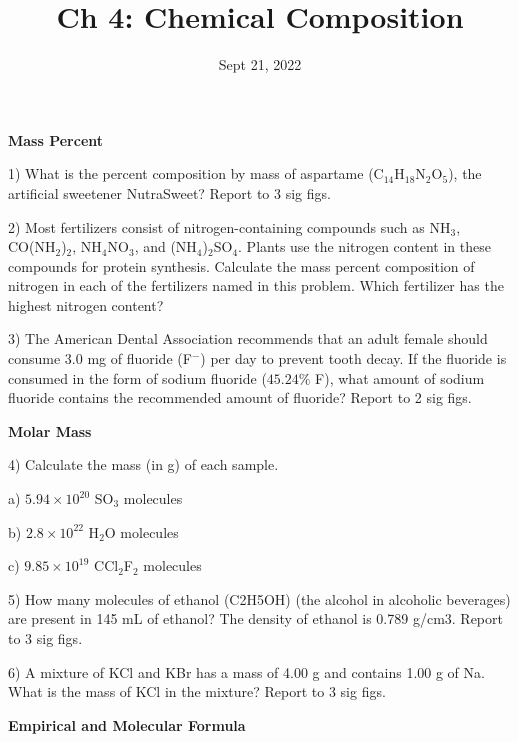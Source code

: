 \documentclass[12pt]{article}
\title{\textbf{Ch 4: Chemical Composition}}
\date{Sept 21, 2022}
\begin{document}
\maketitle 

\textbf{Mass Percent}

1) What is the percent composition by mass of aspartame (C$_{14}$H$_{18}$N$_2$O$_5$),
the artificial sweetener NutraSweet? Report to 3 sig figs.

\vspace{0.5in}

2) Most fertilizers consist of nitrogen-containing compounds such as NH$_3$, CO(NH$_2$)$_2$,
NH$_4$NO$_3$, and (NH$_4$)$_2$SO$_4$. Plants use the nitrogen content in these compounds
for protein synthesis. Calculate the mass percent composition of nitrogen in each of the
fertilizers named in this problem. Which fertilizer has the highest nitrogen content?

\vspace{0.5in}

3) The American Dental Association recommends that an adult female should consume 3.0 mg
of fluoride (F$^-$) per day to prevent tooth decay. If the fluoride is consumed in the form
of sodium fluoride ($45.24\%$ F), what amount of sodium fluoride contains the recommended
amount of fluoride? Report to 2 sig figs.

\vspace{0.5in}


\textbf{Molar Mass}

4) Calculate the mass (in g) of each sample.

a) $5.94 \times 10^{20}$ SO$_3$ molecules

b) $2.8 \times 10^{22}$ H$_2$O molecules

c) $9.85 \times 10^{19}$ CCl$_2$F$_2$ molecules

\vspace{0.5in}

5) How many molecules of ethanol (C2H5OH) (the alcohol in alcoholic beverages) are present
in 145 mL of ethanol? The density of ethanol is 0.789 g/cm3. Report to 3 sig figs.

\vspace{0.5in}

6) A mixture of KCl and KBr has a mass of 4.00 g and contains 1.00 g of Na. What is the
mass of KCl in the mixture? Report to 3 sig figs.

\vspace{0.5in}

\textbf{Empirical and Molecular Formula}
\end{document}
